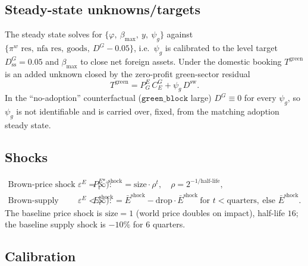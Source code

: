 \documentclass[11pt]{article}
\newcommand{\stst}{\mathrm{ss}}
\newcommand{\dsw}{D^{\mathrm{sw}}}
\newcommand{\DG}{D^{G}}
\newcommand{\PEG}{P^{E}_{G}}
\begin{document}
\subsection{Steady-state unknowns/targets}

The steady state solves for $\{\varphi,\ \beta_{\max},\ y,\ \psi_g\}$ against
$\{\pi^{w}\text{ res},\ \mathrm{nfa}\text{ res},\ \text{goods},\ \DG-0.05\}$, i.e.\
$\psi_g$ is calibrated to the level target $\DG_{\stst}=0.05$ and $\beta_{\max}$ to
close net foreign assets. Under the domestic booking $T^{\text{green}}$ is an
added unknown closed by the zero-profit green-sector residual
\begin{equation}
T^{\text{green}}=\PEG\,C^{G}_{E}+\psi_g\,\dsw . \label{eq:tgreen}
\end{equation}
In the ``no-adoption'' counterfactual ($\texttt{green\_block}$ large) $\DG\equiv 0$
for every $\psi_g$, so $\psi_g$ is not identifiable and is carried over, fixed,
from the matching adoption steady state.

\subsection{Shocks}

\begin{align}
\text{Brown-price shock (requires }\varepsilon^{E}=\infty):&\quad
P^{E*,\text{shock}}_t=\text{size}\cdot\rho^{t},\quad \rho=2^{-1/\text{half-life}},\\
\text{Brown-supply shock (requires }\varepsilon^{E}<\infty):&\quad
E^{\text{shock}}_t=\bar E^{\text{shock}}-\text{drop}\cdot\bar E^{\text{shock}}\ \text{for }t<\text{quarters},\ \text{else }\bar E^{\text{shock}} .
\end{align}
The baseline price shock is $\text{size}=1$ (world price doubles on impact),
half-life $16$; the baseline supply shock is $-10\%$ for $6$ quarters.

\subsection{Calibration}\label{sec:cal}
\end{document}
